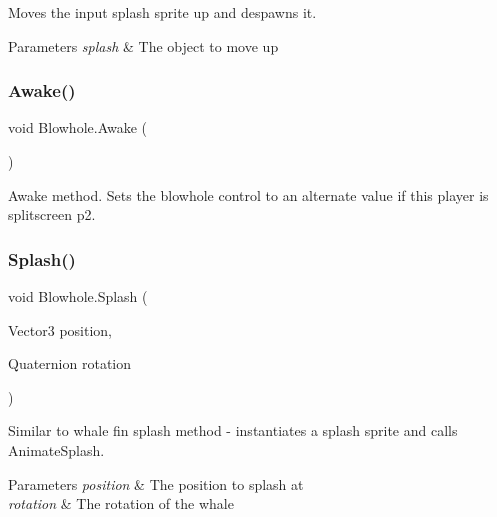 Moves the input splash sprite up and despawns it. 


\begin{DoxyParams}{Parameters}
{\em splash} & The object to move up\\
\hline
\end{DoxyParams}
\mbox{\label{class_blowhole_a1f3c65dc793a21c7eb7ea3fdb3343147}} 
\subsubsection{\texorpdfstring{Awake()}{Awake()}}
{\footnotesize\ttfamily void Blowhole.\+Awake (\begin{DoxyParamCaption}{ }\end{DoxyParamCaption})\hspace{0.3cm}{\ttfamily [private]}}



Awake method. Sets the blowhole control to an alternate value if this player is splitscreen p2. 

\mbox{\label{class_blowhole_ab1aebd5e7a3694f00edc95874f453159}} 
\subsubsection{\texorpdfstring{Splash()}{Splash()}}
{\footnotesize\ttfamily void Blowhole.\+Splash (\begin{DoxyParamCaption}\item[{Vector3}]{position,  }\item[{Quaternion}]{rotation }\end{DoxyParamCaption})}



Similar to whale fin splash method -\/ instantiates a splash sprite and calls Animate\+Splash. 


\begin{DoxyParams}{Parameters}
{\em position} & The position to splash at\\
\hline
{\em rotation} & The rotation of the whale\\
\hline
\end{DoxyParams}
\mbox{\label{class_blowhole_a2be62f8ab9936a90cc8aa90e30f9272c}} 
